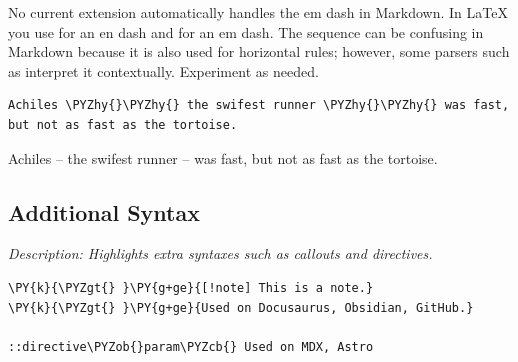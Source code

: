 \documentclass[a4paper,twoside]{article}
\begin{document}
No current extension automatically handles the em dash in Markdown. In \LaTeX{} you use \tscodeinline{-\allowbreak{}-\allowbreak{}} for an en dash and \tscodeinline{-\allowbreak{}-\allowbreak{}-\allowbreak{}} for an em dash. The \tscodeinline{-\allowbreak{}-\allowbreak{}-\allowbreak{}} sequence can be confusing in Markdown because it is also used for horizontal rules; however, some parsers such as  interpret it contextually. Experiment as needed.
\begin{tscode}[lang=md, engine=pygments]
\begin{Verbatim}[commandchars=\\\{\},breaklines, breakanywhere, commandchars=\\\{\}]
Achiles \PYZhy{}\PYZhy{} the swifest runner \PYZhy{}\PYZhy{} was fast, but not as fast as the tortoise.
\end{Verbatim}
\end{tscode}
\begin{displayquote}
Achiles -- the swifest runner -- was fast, but not as fast as the tortoise.
\end{displayquote}
\subsection{Additional Syntax}
\emph{Description: Highlights extra syntaxes such as callouts and directives.}
\begin{tscode}[lang=md, engine=pygments]
\begin{Verbatim}[commandchars=\\\{\},breaklines, breakanywhere, commandchars=\\\{\}]
\PY{k}{\PYZgt{} }\PY{g+ge}{[!note] This is a note.}
\PY{k}{\PYZgt{} }\PY{g+ge}{Used on Docusaurus, Obsidian, GitHub.}

::directive\PYZob{}param\PYZcb{} Used on MDX, Astro
\end{Verbatim}
\end{tscode}
\end{document}
